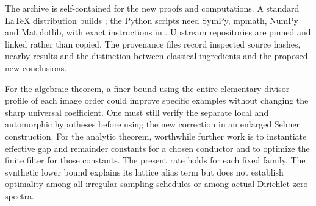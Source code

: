 The archive is self-contained for the new proofs and computations. A
standard LaTeX distribution builds ; the Python scripts
need SymPy, mpmath, NumPy and Matplotlib, with exact instructions in
. Upstream repositories are pinned and linked rather
than copied. The provenance files record inspected source hashes,
nearby results and the distinction between classical ingredients and
the proposed new conclusions.

For the algebraic theorem, a finer bound using the entire elementary
divisor profile of each image order could improve specific examples
without changing the sharp universal coefficient. One must still
verify the separate local and automorphic hypotheses before using the
new correction in an enlarged Selmer construction.
For the analytic theorem, worthwhile further work is to instantiate
effective gap and remainder constants for a chosen conductor and to
optimize the finite filter for those constants. The present rate holds
for each fixed family. The synthetic lower bound explains its lattice
alias term but does not establish optimality among all irregular
sampling schedules or among actual Dirichlet zero spectra.
